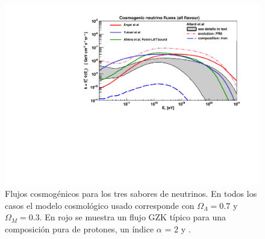 	\begin{figure}[ht]
		\begin{center}
		\includegraphics[width=\textwidth]{fig/introduccion/gzk_fluxes}
		\caption{\label{fig:flujosGZK} Flujos cosmog\'enicos para los tres sabores de neutrinos. En todos los casos el modelo cosmol\'ogico usado corresponde con $\Omega_{\Lambda}=0.7$ y $\Omega_{M}=0.3$. 
		En rojo se muestra un flujo GZK t\'ipico para una composici\'on pura de protones, un \'indice $\alpha$ = 2 y \cite{cite:nuEngel}.
% 		
		}
		\end{center}
	\end{figure}
	
